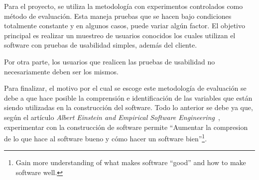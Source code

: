 

Para el proyecto, se utiliza la metodología con experimentos controlados como método de evaluación. Esta maneja pruebas que se hacen bajo condiciones totalmente constante y en algunos casos, puede variar algún factor. El objetivo principal es realizar un muestreo de usuarios conocidos los cuales utilizan el software con pruebas de usabilidad simples, además del cliente.

Por otra parte, los usuarios que realicen las pruebas de usabilidad  no necesariamente deben ser los mismos.

Para finalizar, el motivo por el cual se escoge este metodología de evaluación se debe a que hace posible la comprensión e identificación de las variables que están siendo utilizadas en la construcción del software.  Todo lo anterior se debe ya que, según el artículo \emph{Albert Einstein and Empirical Software Engineering}~\cite{8}, experimentar con la construcción de software permite ``Aumentar la compresion de lo que hace al software bueno y cómo hacer un software bien''\footnote{Gain more understanding of what makes software ``good'' and how to make software well.}.


